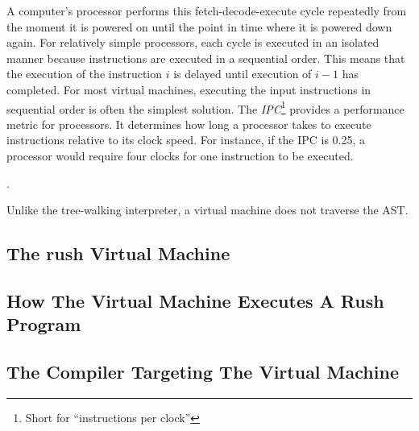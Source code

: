 A computer's processor performs this fetch-decode-execute cycle repeatedly from the moment it is powered on until the point in time where it is powered down again.
For relatively simple processors, each cycle is executed in an isolated manner because instructions are executed in a sequential order.
This means that the execution of the instruction $i$ is delayed until execution of $i - 1$ has completed.
For most virtual machines, executing the input instructions in sequential order is often the simplest solution.
The \emph{IPC}\footnote{Short for \enquote{instructions per clock}} provides a performance metric for processors.
It determines how long a processor takes to execute instructions relative to its clock speed.
For instance, if the IPC is 0.25, a processor would require four clocks for one instruction to be executed.

\cite[pp.~208-209]{Ledin2020-yp}.


Unlike the tree-walking interpreter, a virtual machine does not traverse the AST.

\subsection{The rush Virtual Machine}
\subsection{How The Virtual Machine Executes A Rush Program}
\subsection{The Compiler Targeting The Virtual Machine}
